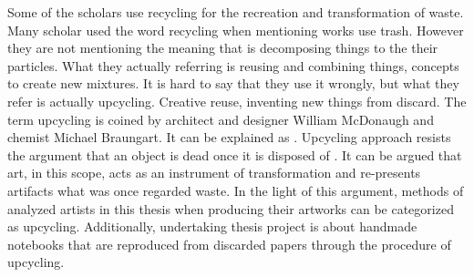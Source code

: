 Some of the scholars use recycling \citep{cerny1996recycled,herman1998trashformations} for the recreation and transformation of waste. Many scholar used the word recycling when mentioning works use trash. However they are not mentioning the meaning that is decomposing things to the their particles. What they actually referring is reusing and combining things, concepts to create new mixtures. It is hard to say that they use it wrongly, but what they refer is actually upcycling. Creative reuse, inventing new things from discard. The term upcycling is coined by architect and designer William McDonaugh and chemist Michael Braungart. It can be explained as  \citep[as cited in][63]{emgin2012trashion}.  Upcycling approach resists the argument that an object is dead once it is disposed of \citep{emgin2012trashion}. It can be argued that art, in this scope, acts as an instrument of transformation and re-presents artifacts what was once regarded waste. In the light of this argument, methods of analyzed artists in this thesis when producing their artworks can be categorized as upcycling. Additionally, undertaking thesis project is about handmade notebooks that are reproduced from discarded papers through the procedure of upcycling.
